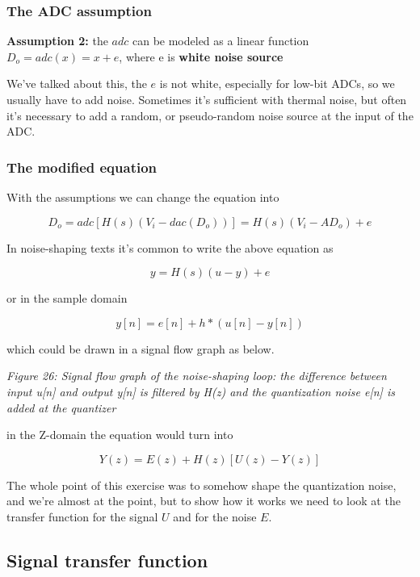 \subsubsection{The ADC assumption}\label{the-adc-assumption}

\textbf{Assumption 2:} the \(adc\) can be modeled as a linear function
\(D_o = adc(x) = x + e\), where e is \textbf{white noise source}

We've talked about this, the \(e\) is not white, especially for low-bit
ADCs, so we usually have to add noise. Sometimes it's sufficient with
thermal noise, but often it's necessary to add a random, or
pseudo-random noise source at the input of the ADC.

\subsubsection{The modified equation}\label{the-modified-equation}

With the assumptions we can change the equation into

\[
D_o = adc\left[H(s)\left(V_i - dac(D_o)\right)\right] = H(s)\left( V_i - A D_o\right) + e
\]

In noise-shaping texts it's common to write the above equation as

\[
y = H(s)(u - y) + e
\]

or in the sample domain

\[ y[n] = e[n] + h*(u[n] - y[n])\]

which could be drawn in a signal flow graph as below.


{
\centering
{}
}

\emph{Figure 26: Signal flow graph of the noise-shaping loop: the
difference between input u{[}n{]} and output y{[}n{]} is filtered by
H(z) and the quantization noise e{[}n{]} is added at the quantizer}

in the Z-domain the equation would turn into

\[ Y(z) = E(z) + H(z)\left[U(z) - Y(z)\right]\]

The whole point of this exercise was to somehow shape the quantization
noise, and we're almost at the point, but to show how it works we need
to look at the transfer function for the signal \(U\) and for the noise
\(E\).

\subsection{Signal transfer function}\label{signal-transfer-function}

